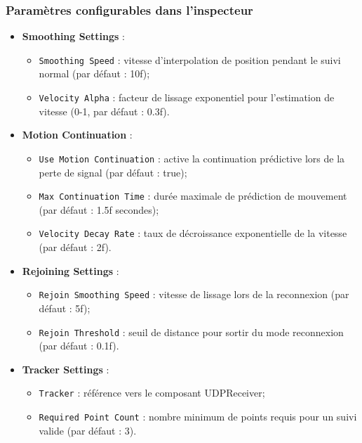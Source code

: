 \documentclass[12pt]{report}
\begin{document}
\subsubsection{Paramètres configurables dans l'inspecteur}

\begin{itemize}
    \vspace{2mm}
    \item \textbf{Smoothing Settings} :
    \begin{itemize}
        \item \texttt{Smoothing Speed} : vitesse d'interpolation de position pendant le suivi normal (par défaut : 10f);
        \item \texttt{Velocity Alpha} : facteur de lissage exponentiel pour l'estimation de vitesse (0-1, par défaut : 0.3f).
    \end{itemize}
    \vspace{2mm}
    \item \textbf{Motion Continuation} :
    \begin{itemize}
        \item \texttt{Use Motion Continuation} : active la continuation prédictive lors de la perte de signal (par défaut : true);
        \item \texttt{Max Continuation Time} : durée maximale de prédiction de mouvement (par défaut : 1.5f secondes);
        \item \texttt{Velocity Decay Rate} : taux de décroissance exponentielle de la vitesse (par défaut : 2f).
    \end{itemize}
    \vspace{2mm}
    \item \textbf{Rejoining Settings} :
    \begin{itemize}
        \item \texttt{Rejoin Smoothing Speed} : vitesse de lissage lors de la reconnexion (par défaut : 5f);
        \item \texttt{Rejoin Threshold} : seuil de distance pour sortir du mode reconnexion (par défaut : 0.1f).
    \end{itemize}
    \vspace{2mm}
    \item \textbf{Tracker Settings} :
    \begin{itemize}
        \item \texttt{Tracker} : référence vers le composant UDPReceiver;
        \item \texttt{Required Point Count} : nombre minimum de points requis pour un suivi valide (par défaut : 3).
    \end{itemize}
    \vspace{2mm}
\end{itemize}
\end{document}
